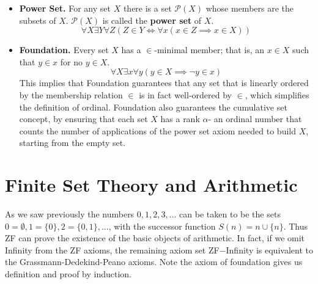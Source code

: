 \documentclass[12pt, a4paper, oneside, openright, titlepage]{book}
\begin{document}
\begin{itemize}
    \item \textbf{Power Set.} For any set $X$ there is a set $\mathcal{P}(X)$ whose members are the subsets of $X$. $\mathcal{P}(X)$ is called the \textbf{power set} of $X$. \begin{equation*}
            \forall X\exists Y\forall Z(Z \in Y \iff \forall x(x \in Z\implies x \in X))
    \end{equation*}
    \item \textbf{Foundation.} Every set $X$ has a $\in$-minimal member; that is, an $x \in X$ such that $y \in x$ for no $y \in X$. \begin{equation*}
            \forall X\exists x\forall y(y \in X\implies \lnot y \in x)
    \end{equation*}
        This implies that Foundation guarantees that any set that is linearly ordered by the membership relation $\in$ is in fact well-ordered by $\in$, which simplifies the definition of ordinal. Foundation also guarantees the cumulative set concept, by ensuring that each set $X$ has a rank $\alpha$- an ordinal number that counts the number of applications of the power set axiom needed to build $X$, starting from the empty set.
\end{itemize}



\section{Finite Set Theory and Arithmetic}

As we saw previously the numbers $0,1,2,3,...$ can be taken to be the sets $0 = \emptyset, 1 = \{0\},2 = \{0,1\},...$, with the successor function $S(n) = n\cup \{n\}$. Thus ZF can prove the existence of the basic objects of arithmetic. In fact, if we omit Infinity from the ZF axioms, the remaining axiom set ZF$-$Infinity is equivalent to the Grassmann-Dedekind-Peano axioms. Note the axiom of foundation gives us definition and proof by induction.
\end{document}
